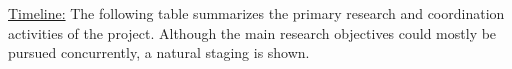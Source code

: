 \def\graycell{\cellcolor[RGB]{200,200,200}}
\def\acell{\cellcolor[rgb]{.6,.9,.55}}
\def\bcell{\cellcolor[rgb]{0.5, 0.7, 1}}
\def\ccell{\cellcolor[rgb]{0.98, 0.91, 0.71}}
\def\dcell{\cellcolor[rgb]{0.64, 0.76, 0.68}}
\def\ecell{\cellcolor[rgb]{0.8, 0.55, 0.4}}
\def\g{}
\def\g{\graycell}
\def\a{\acell}
\def\b{\bcell}
\def\c{\ccell}
\def\d{\dcell}
\def\e{\ecell}
\def\yale{\bcell}
\def\brown{\ecell}
\def\both{\acell}


\def\topic#1{\multicolumn{13}{c}{}\\
  \multicolumn{1}{l}{\bf #1 } & \multicolumn{12}{c}{} \\[3pt] \hline}
\def\numb#1{\hbox to 13pt{\hfill \footnotesize #1\hfill}}
\def\ffour{\numb{Q4}}
\def\three{\numb{Q3}}
\def\two{\numb{Q2}}
\def\one{\numb{Q1}}
\def\four{\multicolumn{1}{c|}{\ffour}}


\vskip4pt \noindent \underline{Timeline:}
The following table summarizes the primary research and coordination
activities of the project. Although the main research objectives 
could mostly be pursued concurrently, a natural staging is shown.


